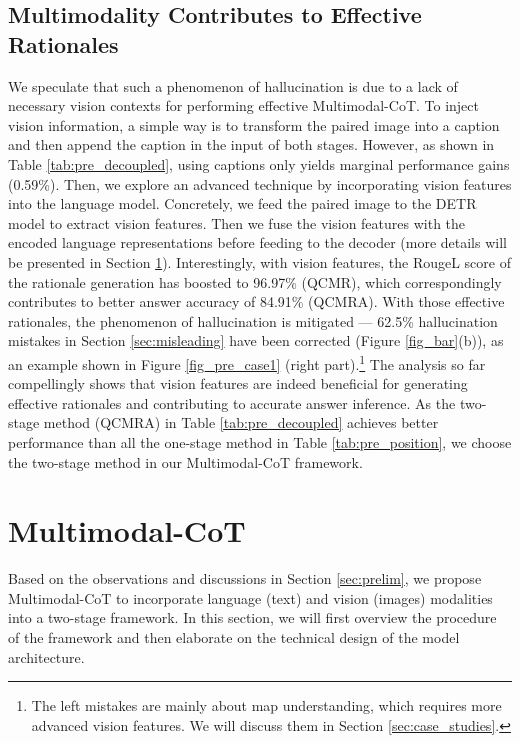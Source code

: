 \documentclass[nohyperref]{article}
\theoremstyle{plain}
\theoremstyle{definition}
\theoremstyle{remark}
\begin{document}
\subsection{Multimodality Contributes to Effective Rationales}\label{sec:multimodal}
We speculate that such a phenomenon of hallucination is due to a lack of necessary vision contexts for performing effective Multimodal-CoT. To inject vision information, a simple way is to transform the paired image into a caption \citep{lu2022learn} and then append the caption in the input of both stages. However, as shown in Table \ref{tab:pre_decoupled}, using captions only yields marginal performance gains (0.59\%). Then, we explore an advanced technique by incorporating vision features into the language model. Concretely, we feed the paired image to the DETR model \citep{carion2020end} to extract vision features. Then we fuse the vision features with the encoded language representations before feeding to the decoder (more details will be presented in Section \ref{sec:mm_cot}). Interestingly, with vision features, the RougeL score of the rationale generation has boosted to 96.97\% (QCMR), which correspondingly contributes to better answer accuracy of 84.91\% (QCMRA).
With those effective rationales, the phenomenon of hallucination is mitigated --- 62.5\% hallucination mistakes in Section \ref{sec:misleading} have been corrected (Figure \ref{fig_bar}(b)), as an example shown in Figure \ref{fig_pre_case1} (right part).\footnote{The left mistakes are mainly about map understanding, which requires more advanced vision features. We will discuss them in Section \ref{sec:case_studies}.} The analysis so far compellingly shows that vision features are indeed beneficial for generating effective rationales and contributing to accurate answer inference. {As the two-stage method (QCMRA) in Table \ref{tab:pre_decoupled} achieves better performance than all the {one-stage} method in Table \ref{tab:pre_position}, we choose the two-stage method in our Multimodal-CoT framework.}



\section{Multimodal-CoT}\label{sec:mm_cot}
Based on the observations and discussions in Section \ref{sec:prelim}, {we propose Multimodal-CoT to incorporate language (text) and vision (images) modalities into a two-stage framework.} In this section, we will first overview the procedure of the framework and then elaborate on the technical design of the model architecture.
\end{document}
